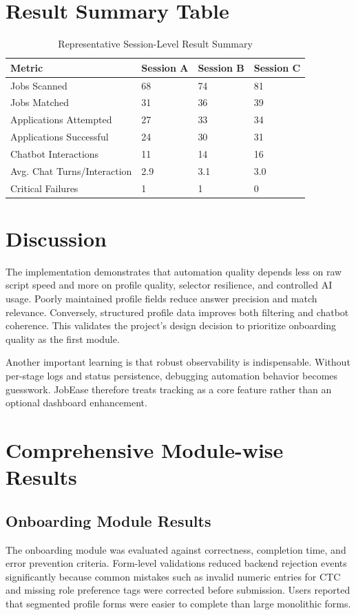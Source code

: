 \documentclass[12pt,a4paper,oneside]{report}
\begin{document}
\section{Result Summary Table}
\begin{table}[H]
\centering
\caption{Representative Session-Level Result Summary}
\begin{tabular}{p{}p{}p{}p{}}
\toprule
Metric & Session A & Session B & Session C \\
\midrule
Jobs Scanned & 68 & 74 & 81 \\
Jobs Matched & 31 & 36 & 39 \\
Applications Attempted & 27 & 33 & 34 \\
Applications Successful & 24 & 30 & 31 \\
Chatbot Interactions & 11 & 14 & 16 \\
Avg. Chat Turns/Interaction & 2.9 & 3.1 & 3.0 \\
Critical Failures & 1 & 1 & 0 \\
\bottomrule
\end{tabular}
\end{table}

\section{Discussion}
The implementation demonstrates that automation quality depends less on raw script speed and more on profile quality, selector resilience, and controlled AI usage. Poorly maintained profile fields reduce answer precision and match relevance. Conversely, structured profile data improves both filtering and chatbot coherence. This validates the project's design decision to prioritize onboarding quality as the first module.

Another important learning is that robust observability is indispensable. Without per-stage logs and status persistence, debugging automation behavior becomes guesswork. JobEase therefore treats tracking as a core feature rather than an optional dashboard enhancement.

\section{Comprehensive Module-wise Results}
\subsection{Onboarding Module Results}
The onboarding module was evaluated against correctness, completion time, and error prevention criteria. Form-level validations reduced backend rejection events significantly because common mistakes such as invalid numeric entries for CTC and missing role preference tags were corrected before submission. Users reported that segmented profile forms were easier to complete than large monolithic forms.
\end{document}
